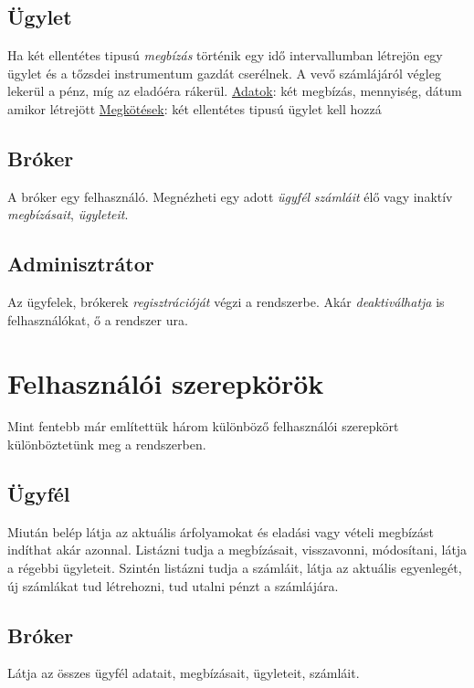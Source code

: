 \subsection{Ügylet}
Ha két ellentétes tipusú \emph{megbízás} történik egy idő intervallumban létrejön egy ügylet és a tőzsdei instrumentum gazdát cserélnek. A vevő számlájáról végleg lekerül a pénz, míg az eladóéra rákerül.
\newline \underline{Adatok}: két megbízás, mennyiség, dátum amikor létrejött
\newline \underline{Megkötések}: két ellentétes tipusú ügylet kell hozzá

\subsection{Bróker}
A bróker egy felhasználó. Megnézheti egy adott \emph{ügyfél} \emph{számláit} élő vagy inaktív \emph{megbízásait}, \emph{ügyleteit}.

\subsection{Adminisztrátor}
Az ügyfelek, brókerek \emph{regisztrációját} végzi a rendszerbe. Akár \emph{deaktiválhatja} is felhasználókat, ő a rendszer ura.


\section{Felhasználói szerepkörök}\label{sect:roles}

Mint fentebb már említettük három különböző felhasználói szerepkört különböztetünk meg a rendszerben.

\subsection{Ügyfél}
Miután belép látja az aktuális árfolyamokat és eladási vagy vételi megbízást indíthat akár azonnal. Listázni tudja a megbízásait, visszavonni, módosítani, látja a régebbi ügyleteit. Szintén listázni tudja a számláit, látja az aktuális egyenlegét, új számlákat tud létrehozni, tud utalni pénzt a számlájára.

\subsection{Bróker}
Látja az összes ügyfél adatait, megbízásait, ügyleteit, számláit.

